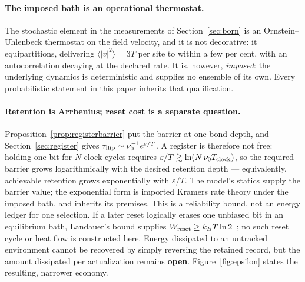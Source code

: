 \documentclass[11pt,a4paper]{article}
\theoremstyle{definition}
\theoremstyle{plain}
\theoremstyle{remark}
\begin{document}
\paragraph{The imposed bath is an operational thermostat.} The stochastic
element in the measurements of Section~\ref{sec:born} is an
Ornstein--Uhlenbeck thermostat on the field velocity, and it is not
decorative: it equipartitions, delivering $\langle|v|^2\rangle = 3T$ per
site to within a few per cent, with an autocorrelation decaying at the
declared rate. It is, however, \emph{imposed}: the underlying dynamics is
deterministic and supplies no ensemble of its own. Every probabilistic
statement in this paper inherits that qualification.

\paragraph{Retention is Arrhenius; reset cost is a separate question.}
Proposition~\ref{prop:registerbarrier} put the barrier at one bond depth,
and Section~\ref{sec:register} gives $\tau_{\rm flip}\sim\nu_0^{-1}
e^{\varepsilon/T}$. A register is therefore not free: holding one bit for
$N$ clock cycles requires $\varepsilon/T \gtrsim \ln(N\,\nu_0 T_{\rm
clock})$, so the required barrier grows logarithmically with the desired
retention depth --- equivalently, achievable retention grows exponentially
with $\varepsilon/T$. The model's statics supply the barrier
value; the exponential form is imported Kramers rate theory under the
imposed bath, and inherits its premises. This is a reliability bound, not
an energy ledger for one selection. If a later reset logically erases one
unbiased bit in an equilibrium bath, Landauer's bound supplies
$W_{\rm reset}\ge k_BT\ln2$~\cite{landauer}; no such reset cycle or heat
flow is constructed here. Energy dissipated to an untracked environment
cannot be recovered by simply reversing the retained record, but the amount
dissipated per actualization remains \textbf{open}. Figure~\ref{fig:epsilon}
states the resulting, narrower economy.
\end{document}
